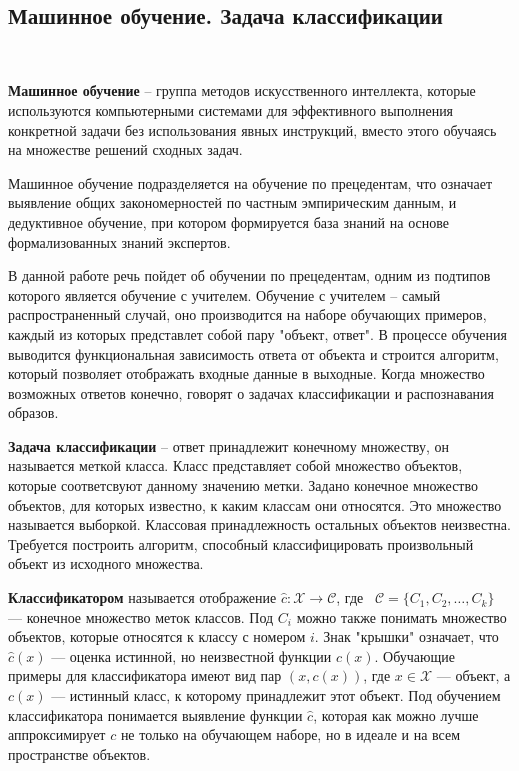 \
\subsection{Машинное обучение. Задача классификации}
\

\textbf{Машинное обучение} – группа методов искусственного интеллекта, которые используются компьютерными системами для эффективного выполнения конкретной задачи без использования явных инструкций, вместо этого обучаясь на множестве решений сходных задач.

Машинное обучение подразделяется на обучение по прецедентам, что означает выявление общих закономерностей по частным эмпирическим данным, и дедуктивное обучение, при котором формируется база знаний на основе формализованных знаний экспертов.

В данной работе речь пойдет об обучении по прецедентам, одним из подтипов которого является обучение с учителем. Обучение с учителем – самый распространенный случай, оно производится на наборе обучающих примеров, каждый из которых представлет собой пару "объект, ответ". В процессе обучения выводится функциональная зависимость ответа от объекта и строится алгоритм, который позволяет отображать входные данные в выходные. Когда множество возможных ответов конечно, говорят о задачах классификации и распознавания образов.

\textbf{Задача классификации} – ответ принадлежит конечному множеству, он называется меткой класса. Класс представляет собой множество объектов, которые соответсвуют данному значению метки. Задано конечное множество объектов, для которых известно, к каким классам они относятся. Это множество называется выборкой. Классовая принадлежность остальных объектов неизвестна. Требуется построить алгоритм, способный классифицировать произвольный объект из исходного множества.

\textbf{Классификатором} называется отображение $\widehat{c}: \mathcal{X} \to \mathcal{C}$, где 
\
$\mathcal{C} = \{C_{1}, C_{2}, \dots, C_{k}\}$ — конечное множество меток классов. Под $C_{i}$ можно также понимать множество объектов, которые относятся к классу с номером $i$. Знак "крышки" означает, что $\widehat{c}(x)$ — оценка истинной, но неизвестной функции $c(x)$. Обучающие примеры для классификатора имеют вид пар $(x,c(x))$, где $x \in \mathcal{X}$ — объект, а $c(x)$ — истинный класс, к которому принадлежит этот объект. Под обучением классификатора понимается выявление функции $\widehat{c}$, которая как можно лучше аппроксимирует $c$ не только на обучающем наборе, но в идеале и на всем пространстве объектов.\cite{MLFLACH}

